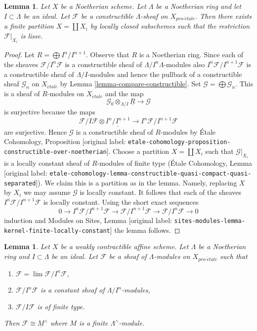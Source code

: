 \documentclass[10pt,a4paper]{article}
\theoremstyle{plain}
\newtheorem{lemma}[subsection]{Lemma}
\theoremstyle{definition}
\theoremstyle{remark}
\numberwithin{equation}{subsection}
\def\lim{\mathop{\mathrm{lim}}\nolimits}
\def\proetale{{pro\text{-}\acute{e}tale}}
\def\etale{{\acute{e}tale}}
\begin{document}
\begin{lemma}
\label{lemma-Noetherian-constructible}
Let $X$ be a Noetherian scheme. Let $\Lambda$ be a Noetherian ring and
let $I \subset \Lambda$ be an ideal. Let $\mathcal{F}$ be a
constructible $\Lambda$-sheaf on $X_\proetale$.
Then there exists a finite partition $X = \coprod X_i$ by
locally closed subschemes such that the restriction $\mathcal{F}|_{X_i}$
is lisse.
\end{lemma}

\begin{proof}
Let $R = \bigoplus I^n/I^{n + 1}$. Observe that $R$ is a Noetherian ring.
Since each of the sheaves
$\mathcal{F}/I^n\mathcal{F}$ is a constructible sheaf of
$\Lambda/I^n\Lambda$-modules also $I^n\mathcal{F}/I^{n + 1}\mathcal{F}$
is a constructible sheaf of $\Lambda/I$-modules and hence the pullback
of a constructible sheaf $\mathcal{G}_n$ on $X_\etale$ by
Lemma \ref{lemma-compare-constructible}.
Set $\mathcal{G} = \bigoplus \mathcal{G}_n$. This is a sheaf
of $R$-modules on $X_\etale$ and the map
$$
\mathcal{G}_0 \otimes_{\Lambda/I} \underline{R}
\longrightarrow
\mathcal{G}
$$
is surjective because the maps
$$
\mathcal{F}/I\mathcal{F} \otimes \underline{I^n/I^{n + 1}} \to
I^n\mathcal{F}/I^{n + 1}\mathcal{F}
$$
are surjective. Hence $\mathcal{G}$ is a constructible sheaf of
$R$-modules by \'Etale Cohomology, Proposition
\textnormal{[original label: \nolinkurl{etale-cohomology-proposition-constructible-over-noetherian}]}.
Choose a partition $X = \coprod X_i$ such that
$\mathcal{G}|_{X_i}$ is a locally constant sheaf of $R$-modules
of finite type (\'Etale Cohomology, Lemma
\textnormal{[original label: \nolinkurl{etale-cohomology-lemma-constructible-quasi-compact-quasi-separated}]}).
We claim this is a partition as in the lemma.
Namely, replacing $X$ by $X_i$ we may assume $\mathcal{G}$ is locally
constant. It follows that each of the sheaves
 $I^n\mathcal{F}/I^{n + 1}\mathcal{F}$
is locally constant. Using the short exact sequences
$$
0 \to I^n\mathcal{F}/I^{n + 1}\mathcal{F} \to
\mathcal{F}/I^{n + 1}\mathcal{F} \to \mathcal{F}/I^n\mathcal{F} \to 0
$$
induction and Modules on Sites, Lemma
\textnormal{[original label: \nolinkurl{sites-modules-lemma-kernel-finite-locally-constant}]}
the lemma follows.
\end{proof}

\begin{lemma}
\label{lemma-weird}
Let $X$ be a weakly contractible affine scheme. Let $\Lambda$ be a Noetherian
ring and $I \subset \Lambda$ be an ideal. Let $\mathcal{F}$ be a sheaf of
$\Lambda$-modules on $X_\proetale$ such that
\begin{enumerate}
\item $\mathcal{F} = \lim \mathcal{F}/I^n\mathcal{F}$,
\item $\mathcal{F}/I^n\mathcal{F}$ is a constant sheaf of
$\Lambda/I^n$-modules,
\item $\mathcal{F}/I\mathcal{F}$ is of finite type.
\end{enumerate}
Then $\mathcal{F} \cong \underline{M}^\wedge$ where $M$ is
a finite $\Lambda^\wedge$-module.
\end{lemma}
\end{document}
